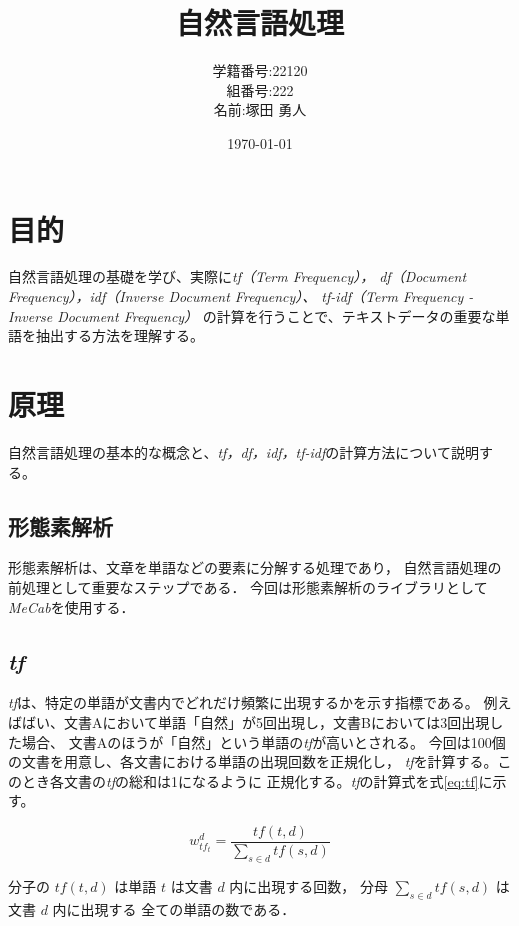 \documentclass[a4paper,11pt,dvipdfmx]{jsarticle}
\begin{document}
\title{自然言語処理}
\author{学籍番号:22120 \\ 組番号:222 \\名前:塚田 勇人}
\date{\today}
\maketitle

\newpage

\section{目的}
自然言語処理の基礎を学び、実際に\textit{tf（Term Frequency），
df（Document Frequency），idf（Inverse Document Frequency）、
tf-idf（Term Frequency - Inverse Document Frequency）}
の計算を行うことで、テキストデータの重要な単語を抽出する方法を理解する。

\section{原理}
自然言語処理の基本的な概念と、\textit{tf，df，idf，tf-idf}の計算方法について説明する。

\subsection{形態素解析}
形態素解析は、文章を単語などの要素に分解する処理であり，
自然言語処理の前処理として重要なステップである．
今回は形態素解析のライブラリとして
\textit{MeCab}を使用する．

\subsection{\textit{tf}}
\textit{tf}は、特定の単語が文書内でどれだけ頻繁に出現するかを示す指標である。
例えばばい、文書Aにおいて単語「自然」が5回出現し，文書Bにおいては3回出現した場合、
文書Aのほうが「自然」という単語の\textit{tf}が高いとされる。
今回は100個の文書を用意し、各文書における単語の出現回数を正規化し，
\textit{tf}を計算する。このとき各文書の\textit{tf}の総和は1になるように
正規化する。\textit{tf}の計算式を式\ref{eq:tf}に示す。

\begin{equation}
w_{tf_t}^d = \frac{tf(t, d)}{\sum_{s \in d} tf(s, d)}
\label{eq:tf}
\end{equation}

分子の \( tf(t,d) \) は単語 \( t \) は文書 \( d \) 内に出現する回数，
分母 \( \sum_{s \in d} tf(s,d) \) は文書 \( d \) 内に出現する
全ての単語の数である．
\end{document}
